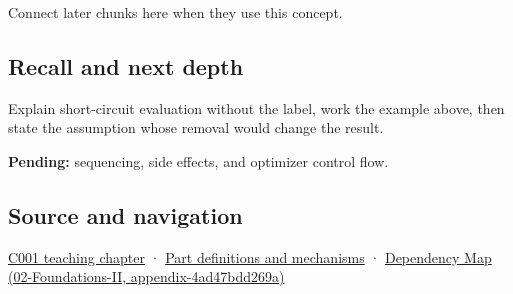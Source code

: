 Connect later chunks here when they use this concept.

\subsection{Recall and next depth}\label{recall-and-next-depth}

Explain short-circuit evaluation without the label, work the example above, then state the assumption whose removal would change the result.

\textbf{Pending:} sequencing, side effects, and optimizer control flow.

\subsection{Source and navigation}\label{source-and-navigation}

\href{Continuous\%20Notes/Computing\%20Foundations\%20-\%20From\%20Bits\%20to\%20C++\%20and\%20Systems\%20APIs\#From\%20a\%20signal\%20to\%20an\%20interpretation}{C001 teaching chapter} · \hyperref[appendix-fd090d982a15]{Part definitions and mechanisms} · \href{}{Dependency Map (02-Foundations-II, appendix-4ad47bdd269a)}

